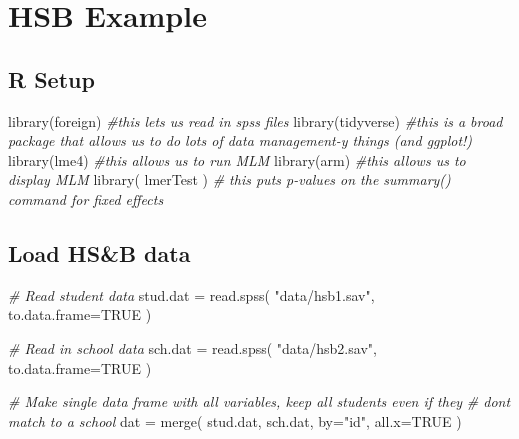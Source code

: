 \documentclass[
  letterpaper,
  DIV=11,
  numbers=noendperiod]{scrreprt}
\newenvironment{Shaded}{\begin{snugshade}}{\end{snugshade}}
\newcommand{\AttributeTok}[1]{\textcolor[rgb]{0.49,0.56,0.16}{#1}}
\newcommand{\CommentTok}[1]{\textcolor[rgb]{0.38,0.63,0.69}{\textit{#1}}}
\newcommand{\ConstantTok}[1]{\textcolor[rgb]{0.53,0.00,0.00}{#1}}
\newcommand{\FunctionTok}[1]{\textcolor[rgb]{0.02,0.16,0.49}{#1}}
\newcommand{\NormalTok}[1]{\textcolor[rgb]{0.00,0.44,0.13}{#1}}
\newcommand{\OtherTok}[1]{\textcolor[rgb]{0.00,0.44,0.13}{#1}}
\newcommand{\StringTok}[1]{\textcolor[rgb]{0.25,0.44,0.63}{#1}}
\begin{document}
\hypertarget{hsb-example-1}{%
\chapter{HSB Example}\label{hsb-example-1}}

\hypertarget{r-setup-2}{%
\section{R Setup}\label{r-setup-2}}

\begin{Shaded}
\begin{Highlighting}[]
\FunctionTok{library}\NormalTok{(foreign) }\CommentTok{\#this lets us read in spss files}
\FunctionTok{library}\NormalTok{(tidyverse) }\CommentTok{\#this is a broad package that allows us to do lots of data management{-}y things (and ggplot!)}
\FunctionTok{library}\NormalTok{(lme4) }\CommentTok{\#this allows us to run MLM}
\FunctionTok{library}\NormalTok{(arm) }\CommentTok{\#this allows us to display MLM}
\FunctionTok{library}\NormalTok{( lmerTest ) }\CommentTok{\# this puts p{-}values on the summary() command for fixed effects}
\end{Highlighting}
\end{Shaded}

\hypertarget{load-hsb-data}{%
\section{Load HS\&B data}\label{load-hsb-data}}

\begin{Shaded}
\begin{Highlighting}[]
\CommentTok{\# Read student data}
\NormalTok{stud.dat }\OtherTok{=} \FunctionTok{read.spss}\NormalTok{( }\StringTok{"data/hsb1.sav"}\NormalTok{, }\AttributeTok{to.data.frame=}\ConstantTok{TRUE}\NormalTok{ )}

\CommentTok{\# Read in school data}
\NormalTok{sch.dat }\OtherTok{=} \FunctionTok{read.spss}\NormalTok{( }\StringTok{"data/hsb2.sav"}\NormalTok{, }\AttributeTok{to.data.frame=}\ConstantTok{TRUE}\NormalTok{ )}

\CommentTok{\# Make single data frame with all variables, keep all students even if they}
\CommentTok{\# don\textquotesingle{}t match to a school}
\NormalTok{dat }\OtherTok{=} \FunctionTok{merge}\NormalTok{( stud.dat, sch.dat, }\AttributeTok{by=}\StringTok{"id"}\NormalTok{, }\AttributeTok{all.x=}\ConstantTok{TRUE}\NormalTok{ )}
\end{Highlighting}
\end{Shaded}
\end{document}
